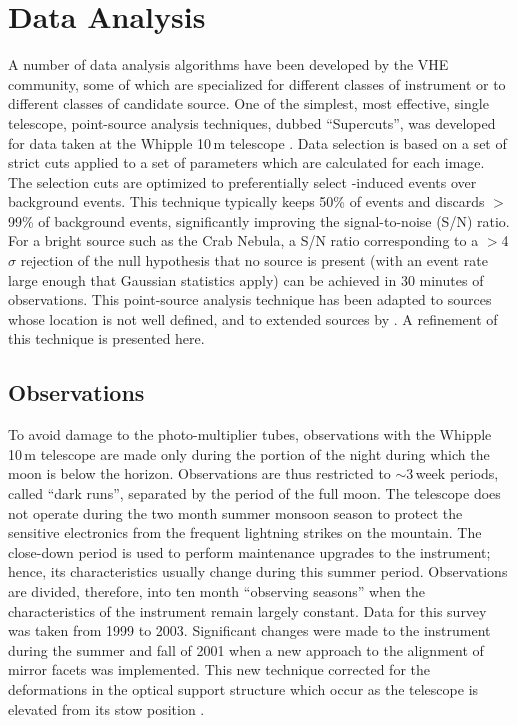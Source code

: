 \chapter{Data Analysis}
\label{CHAP::ANALYSIS}
\newcommand{\Pairs}{\textsc{On/Off}}

A number of data analysis algorithms have been developed by the VHE
\Gray community, some of which are specialized for different classes 
of instrument or to different classes of candidate \Gray source. One
of the simplest, most effective, single telescope, point-source
analysis techniques, dubbed ``Supercuts'', was developed for data
taken at the Whipple 10\,m telescope \citep{REF::PUNCH::NATURE1992}. 
Data selection is based on a set of strict cuts applied to a set of
parameters which are calculated for each image. The selection cuts are
optimized to preferentially select \Grayc-induced events over
background events. This technique typically keeps 50\% of \Gray events
and discards $>$99\% of background events, significantly improving the
signal-to-noise (S/N) ratio. For a bright source such as the Crab
Nebula, a S/N ratio corresponding to a $>$4$\sigma$ rejection of the
null hypothesis that no source is present (with an event rate large
enough that Gaussian statistics apply) can be achieved in 30 minutes
of observations. This point-source analysis technique has been adapted
to sources whose location is not well defined, and to extended sources
by \citet{REF::LESSARD::2001APP}. A refinement of this technique is
presented here.

\section{Observations}
\label{SEC::ANALYSIS::OBSERVATIONS}

To avoid damage to the photo-multiplier tubes, observations with the
Whipple 10\,m telescope are made only during the portion of the night
during which the moon is below the horizon. Observations are thus
restricted to $\sim3$\,week periods, called ``dark runs'', separated
by the period of the full moon. The telescope does not operate during
the two month summer monsoon season to protect the sensitive
electronics from the frequent lightning strikes on the mountain. The
close-down period is used to perform maintenance upgrades to the
instrument; hence, its characteristics usually change during this
summer period. Observations are divided, therefore, into ten month
``observing seasons'' when the characteristics of the instrument
remain largely constant. Data for this survey was taken from 1999 to
2003. Significant changes were made to the instrument during the
summer and fall of 2001 when a new approach to the alignment of mirror
facets was implemented. This new technique corrected for the
deformations in the optical support structure which occur as the
telescope is elevated from its stow position
\citep{REF::SCHROEDTER::2002APS}.

